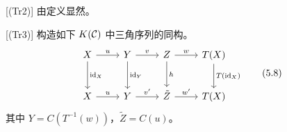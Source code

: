 
[(Tr2)] 由定义显然。

[(Tr3)] 构造如下 $K(\mathcal{C})$ 中三角序列的同构。
\begin{equation}
\begin{tikzcd}[row sep=2.4em, column sep=2.4em]
X \arrow[r,"u"] \arrow[d,"\id_X"] & Y \arrow[r,"v"] \arrow[d,"\id_Y"] & Z \arrow[r,"w"] \arrow[d,"h"] & T(X) \arrow[d,"T(\id_X)"] \\
X \arrow[r,"u"] & Y \arrow[r,"v'"] & \tilde Z \arrow[r,"w'"] & T(X)
\end{tikzcd} \tag{5.8}
\end{equation}
其中 $Y=C(T^{-1}(w))$，$\tilde Z=C(u)$。

